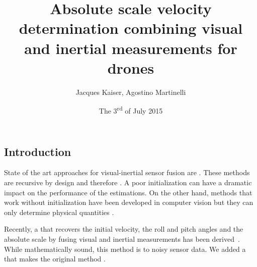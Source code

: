 \documentclass[final]{beamer}
\title
[ARSO, 1 - 3 July 2015, Lyon, France] %
{ %
Absolute scale velocity determination combining visual and inertial measurements for drones
}
\author{ %
Jacques Kaiser, Agostino Martinelli
}
\institute
[INRIA] %
{
  Team Chroma, INRIA
}
\date{The 3\textsuperscript{rd} of July 2015}
\begin{document}
\begin{frame}[t]
\begin{multicols}{3}

\section{Introduction}

State of the art approaches for visual-inertial sensor fusion are .
These methods are recursive by design and therefore .
A poor initialization can have a
dramatic impact on the performance of the estimations.
On the other hand, methods that work without initialization have been developed in computer vision but
they can only determine physical quantities .

Recently, a  that recovers the initial velocity, the roll and pitch angles and the absolute scale by fusing visual and inertial measurements has been derived~\cite{ref1, ref2}.
While mathematically sound, this method is  to noisy sensor data.
We added a  that makes the original method .



\begin{figure}
  \centering
  \begin{subfigure}[b]{0.4\columnwidth}
    \hspace{-1cm}
\end{subfigure}
\end{figure}
\end{multicols}
\end{frame}
\end{document}
